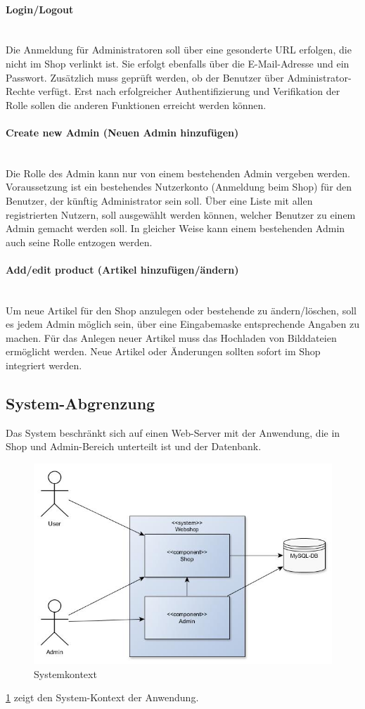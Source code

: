 \paragraph{Login/Logout}$\;$ \\
Die Anmeldung für Administratoren soll über eine gesonderte URL erfolgen, die nicht im Shop verlinkt ist.
Sie erfolgt ebenfalls über die E-Mail-Adresse und ein Passwort. Zusätzlich muss geprüft werden, ob der Benutzer über Administrator-Rechte verfügt.
Erst nach erfolgreicher Authentifizierung und Verifikation der Rolle sollen die anderen Funktionen erreicht werden können.
\paragraph{Create new Admin (Neuen Admin hinzufügen)}$\;$ \\
Die Rolle des Admin kann nur von einem bestehenden Admin vergeben werden.
Voraussetzung ist ein bestehendes Nutzerkonto (Anmeldung beim Shop) für den Benutzer, der künftig Administrator sein soll.
Über eine Liste mit allen registrierten Nutzern, soll ausgewählt werden können, welcher Benutzer zu einem Admin gemacht werden soll.
In gleicher Weise kann einem bestehenden Admin auch seine Rolle entzogen werden.
\paragraph{Add/edit product (Artikel hinzufügen/ändern)}$\;$ \\
Um neue Artikel für den Shop anzulegen oder bestehende zu ändern/löschen, soll es jedem Admin möglich sein, über eine Eingabemaske entsprechende Angaben zu machen.
Für das Anlegen neuer Artikel muss das Hochladen von Bilddateien ermöglicht werden.
Neue Artikel oder Änderungen sollten sofort im Shop integriert werden.
\subsection{System-Abgrenzung}
Das System beschränkt sich auf einen Web-Server mit der Anwendung, die in Shop und Admin-Bereich unterteilt ist und der Datenbank.
\begin{figure}[ht!]
	\centering
	\includegraphics[width=\linewidth]{bilder/kap4/system_abgrenzung}
	\caption{Systemkontext}
	\label{fig:system_context}
\end{figure}
\cref{fig:system_context} zeigt den System-Kontext der Anwendung.
